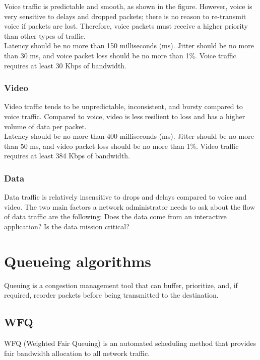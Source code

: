Voice traffic is predictable and smooth, as shown in the figure. However, voice is very sensitive to delays and dropped packets; there is no reason to re-transmit voice if packets are lost. Therefore, voice packets must receive a higher priority than other types of traffic.\\

Latency should be no more than 150 milliseconds (ms). Jitter should be no more than 30 ms, and voice packet loss should be no more than 1\%. Voice traffic requires at least 30 Kbps of bandwidth.

\subsubsection{Video}

Video traffic tends to be unpredictable, inconsistent, and bursty compared to voice traffic. Compared to voice, video is less resilient to loss and has a higher volume of data per packet.\\

Latency should be no more than 400 milliseconds (ms). Jitter should be no more than 50 ms, and video packet loss should be no more than 1\%. Video traffic requires at least 384 Kbps of bandwidth.

\subsubsection{Data}

Data traffic is relatively insensitive to drops and delays compared to voice and video. The two main factors a network administrator needs to ask about the flow of data traffic are the following: Does the data come from an interactive application? Is the data mission critical?

\section{Queueing algorithms}
Queuing is a congestion management tool that can buffer, prioritize, and, if required, reorder packets before being transmitted to the destination.

\subsection{WFQ}

WFQ (Weighted Fair Queuing) is an automated scheduling method that provides fair bandwidth allocation to all network traffic. \\

